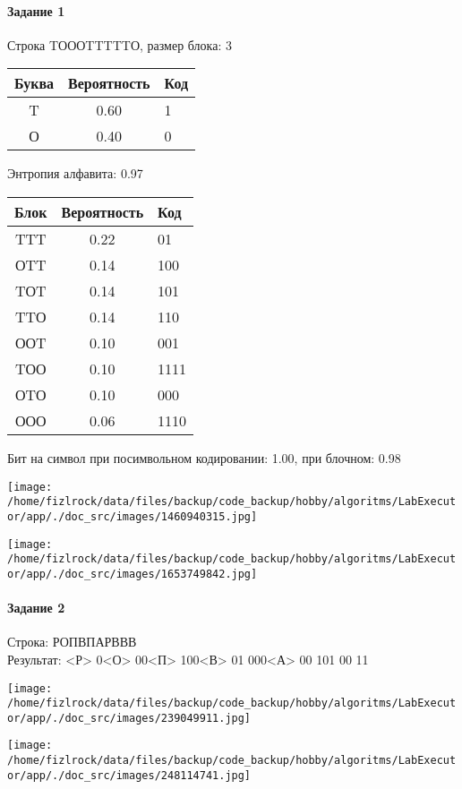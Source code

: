 \documentclass[a4paper, 12pt]{article}
\begin{document}
\paragraph{Задание 1}

Строка TОООTTTTTО, размер блока: 3
\begin{center}
 \begin{tabular}{ |c|c|l| } 
  \hline
     Буква & Вероятность & Код\\ \hline
T & 0.60 & 1\\\hline
О & 0.40 & 0
\\ \hline \end{tabular}
\end{center}
Энтропия алфавита: 0.97
\begin{center}
 \begin{tabular}{ |c|c|l| } 
  \hline
     Блок & Вероятность & Код\\ \hline
TTT & 0.22 & 01\\\hline
ОTT & 0.14 & 100\\\hline
TОT & 0.14 & 101\\\hline
TTО & 0.14 & 110\\\hline
ООT & 0.10 & 001\\\hline
TОО & 0.10 & 1111\\\hline
ОTО & 0.10 & 000\\\hline
ООО & 0.06 & 1110
\\ \hline \end{tabular}
\end{center}
Бит на символ при посимвольном кодировании: 1.00, при блочном: 0.98

\texttt{[image: /home/fizlrock/data/files/backup/code\_backup/hobby/algoritms/LabExecutor/app/./doc\_src/images/1460940315.jpg]}

\texttt{[image: /home/fizlrock/data/files/backup/code\_backup/hobby/algoritms/LabExecutor/app/./doc\_src/images/1653749842.jpg]}
\pagebreak
\paragraph{Задание 2}

Строка: 
РОПВПАРВВВ\\
Результат: <Р> 0<О> 00<П> 100<В> 01 000<А> 00 101 00 11

\texttt{[image: /home/fizlrock/data/files/backup/code\_backup/hobby/algoritms/LabExecutor/app/./doc\_src/images/239049911.jpg]}

\texttt{[image: /home/fizlrock/data/files/backup/code\_backup/hobby/algoritms/LabExecutor/app/./doc\_src/images/248114741.jpg]}
\end{document}
